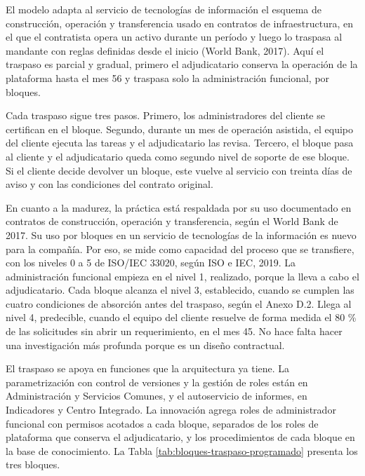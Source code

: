 \documentclass[subdoc]{../../comun/overfore}
\begin{document}
El modelo adapta al servicio de tecnologías de información el esquema de construcción, operación y transferencia usado en contratos de infraestructura, en el que el contratista opera un activo durante un período y luego lo traspasa al mandante con reglas definidas desde el inicio (World Bank, 2017). Aquí el traspaso es parcial y gradual, primero el adjudicatario conserva la operación de la plataforma hasta el mes 56 y traspasa solo la administración funcional, por bloques.

Cada traspaso sigue tres pasos. Primero, los administradores del cliente se certifican en el bloque. Segundo, durante un mes de operación asistida, el equipo del cliente ejecuta las tareas y el adjudicatario las revisa. Tercero, el bloque pasa al cliente y el adjudicatario queda como segundo nivel de soporte de ese bloque. Si el cliente decide devolver un bloque, este vuelve al servicio con treinta días de aviso y con las condiciones del contrato original.

En cuanto a la madurez, la práctica está respaldada por su uso documentado en contratos de construcción, operación y transferencia, según el World Bank de 2017. Su uso por bloques en un servicio de tecnologías de la información es nuevo para la compañía. Por eso, se mide como capacidad del proceso que se transfiere, con los niveles 0 a 5 de ISO/IEC 33020, según ISO e IEC, 2019. La administración funcional empieza en el nivel 1, realizado, porque la lleva a cabo el adjudicatario. Cada bloque alcanza el nivel 3, establecido, cuando se cumplen las cuatro condiciones de absorción antes del traspaso, según el Anexo D.2. Llega al nivel 4, predecible, cuando el equipo del cliente resuelve de forma medida el 80 \% de las solicitudes sin abrir un requerimiento, en el mes 45. No hace falta hacer una investigación más profunda porque es un diseño contractual.

El traspaso se apoya en funciones que la arquitectura ya tiene. La parametrización con control de versiones y la gestión de roles están en Administración y Servicios Comunes, y el autoservicio de informes, en Indicadores y Centro Integrado. La innovación agrega roles de administrador funcional con permisos acotados a cada bloque, separados de los roles de plataforma que conserva el adjudicatario, y los procedimientos de cada bloque en la base de conocimiento. La Tabla \ref{tab:bloques-traspaso-programado} presenta los tres bloques.
\end{document}
